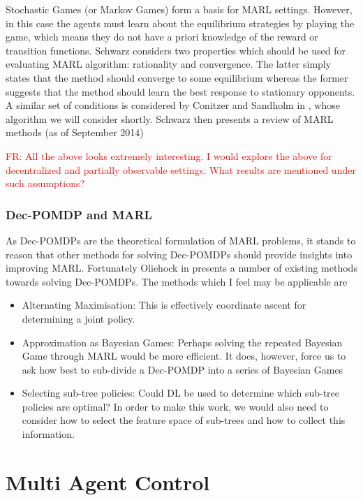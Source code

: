 \documentclass[preprint,11pt]{report}
\newcommand\fr[1]{\textcolor{red}{FR: #1}}
\begin{document}
Stochastic Games (or Markov Games) form a basis for MARL
settings. However, in this case the agents must learn about the
equilibrium strategies by playing the game, which means they do not
have a priori knowledge of the reward or transition functions. Schwarz
considers two properties which should be used for evaluating MARL
algorithm: rationality and convergence. The latter simply states that
the method should converge to some equilibrium whereas the former
suggests that the method should learn the best response to stationary
opponents. A similar set of conditions is considered by Conitzer and
Sandholm in \cite{ConitzerAWESOME:}, whose algorithm we will consider
shortly. Schwarz then presents a review of MARL methods (as of
September 2014)

\fr{All the above looks extremely interesting. I would explore the
  above for decentralized and partially observable settings. What
  results are mentioned \cite{SchwartzMulti-agentApproach} under such
  assumptions?}

\subsection*{Dec-POMDP and MARL}

As Dec-POMDPs are the theoretical formulation of MARL problems, it stands to reason that other
methods for solving Dec-POMDPs should provide insights into improving MARL. Fortunately Oliehock in
\cite{OliehoekDecentralizedPOMDPs} presents a number of existing methods towards solving Dec-POMDPs.
The methods which I feel may be applicable are  \begin{itemize} \item Alternating Maximisation: This
is effectively coordinate ascent for determining a joint policy. \item Approximation as Bayesian
Games: Perhaps solving the repeated Bayesian Game through MARL would be more efficient. It does,
however, force us to ask how best to sub-divide a Dec-POMDP into a series of Bayesian Games  \item
Selecting sub-tree policies: Could DL be used to determine which sub-tree policies are optimal? In
order to make this work, we would also need to consider how to select the feature space of sub-trees
and how to collect this information. \end{itemize}

\chapter{Multi Agent Control}
\end{document}
